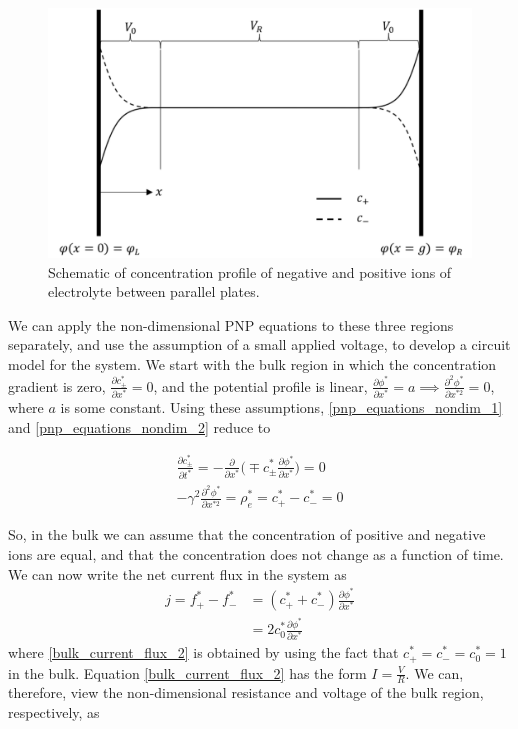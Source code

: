 \begin{figure}[htpb]
    \begin{center}
    \includegraphics[width=0.7\linewidth]{Chapter3/figure/conc_profile.png}
    \caption{Schematic of concentration profile of negative and positive ions of electrolyte between parallel plates.}\label{conc_profile}
    \end{center}
\end{figure}

We can apply the non-dimensional PNP equations to these three regions separately, and use the assumption of a small applied voltage, to develop a circuit model for the system. We start with the bulk region in which the concentration gradient is zero, $\frac{\partial c_\pm^*}{\partial x^*} = 0$, and the potential profile is linear, $\frac{\partial \phi^*}{\partial x^*}=a \implies \frac{\partial^2 \phi^*}{\partial x^{*2}}=0$, where $a$ is some constant. Using these assumptions, \ref{pnp_equations_nondim_1} and \ref{pnp_equations_nondim_2} reduce to

\begin{align}
    \frac{\partial c_\pm^*}{\partial t^*} = - \frac{\partial}{\partial x^*}\bigg( \mp  c_\pm^* \frac{\partial \phi^*}{\partial x^*}\bigg) = 0 \label{pnp_equations_simple_nondim_1} \\
    -\gamma^2 \frac{\partial^2 \phi^*}{\partial x^{*2}} = \rho_e^* = c_+^* - c_-^* = 0\label{pnp_equations_simple_nondim_2} 
\end{align}

So, in the bulk we can assume that the concentration of positive and negative ions are equal, and that the concentration does not change as a function of time. We can now write the net current flux in the system as
\begin{align}
    j = f_+^* - f_-^* & = (c_+^* + c_-^*)\frac{\partial \phi^*}{\partial x^*} \label{bulk_current_flux_1} \\ 
    & = 2c_0^*\frac{\partial \phi^*}{\partial x^*} \label{bulk_current_flux_2}  
\end{align}
where \ref{bulk_current_flux_2} is obtained by using the fact that $c_+^* = c_-^*=c_0^*=1$ in the bulk. Equation \ref{bulk_current_flux_2} has the form $I=\frac{V}{R}$. We can, therefore, view the non-dimensional resistance and voltage of the bulk region, respectively, as 

